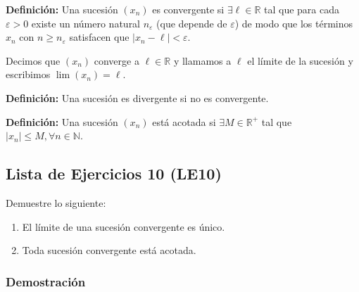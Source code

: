 \documentclass[11pt]{article}
\newcommand{\N}{\mathbb{N}}
\newcommand{\R}{\mathbb{R}}
\begin{document}
\textbf{Definición:} Una sucesión $(x_n)$ es convergente si $\exists \ell \in \R$ tal que para cada $\varepsilon>0$ existe un número natural $n_\varepsilon$ (que depende de $\varepsilon$) de modo que los términos $x_n$ con $n\geq n_\varepsilon$ satisfacen que $|x_n-\ell|<\varepsilon$.

Decimos que $(x_n)$ converge a $\ell \in \R$ y llamamos a $\ell$ el límite de la sucesión y escribimos $\lim (x_n) = \ell$.

\textbf{Definición:} Una sucesión es divergente si no es convergente.

\textbf{Definición:} Una sucesión $(x_n)$ está acotada si $\exists M\in \R^+$ tal que $|x_n|\leq M, \forall n\in \N$.

\subsection*{Lista de Ejercicios 10 (LE10)}

Demuestre lo siguiente:

\begin{enumerate}[label=\alph*)]
    \item El límite de una sucesión convergente es único.
    \item Toda sucesión convergente está acotada.
\end{enumerate}

\subsubsection*{Demostración}
\end{document}
